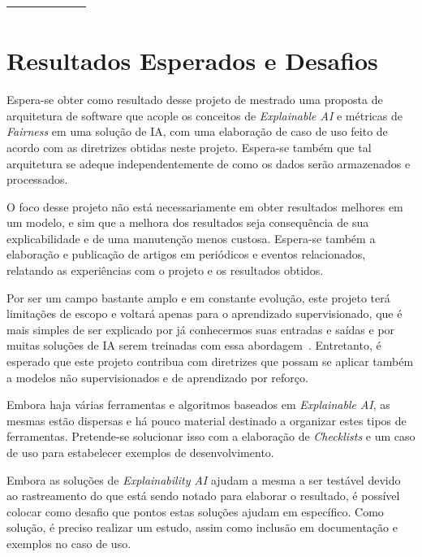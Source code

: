 \documentclass[portugues, 12pt, a4paper]{article}
\newcommand{\cmark}{\ding{51}}
\begin{document}
\begin{table}[h]
\begin{center}
{\begin{tabular}{ccccccccc}
     &  &  & \cmark &  & \cmark & \\
    \bottomrule
  \end{tabular}}
\end{center}
\end{table}

\section{Resultados Esperados e Desafios}

Espera-se obter como resultado desse projeto de mestrado uma proposta de arquitetura de software que acople os conceitos de \textit{Explainable AI} e métricas de \textit{Fairness} em uma solução de IA, com uma elaboração de caso de uso feito de acordo com as diretrizes obtidas neste projeto. Espera-se também que tal arquitetura se adeque independentemente de como os dados serão armazenados e processados.

O foco desse projeto não está necessariamente em obter resultados melhores em um modelo, e sim que a melhora dos resultados seja consequência de sua explicabilidade e de uma manutenção menos custosa. Espera-se também a elaboração e publicação de artigos em periódicos e eventos relacionados, relatando as experiências com o projeto e os resultados obtidos.

Por ser um campo bastante amplo e em constante evolução, este projeto terá limitações de escopo e voltará apenas para o aprendizado supervisionado, que é mais simples de ser explicado por já conhecermos suas entradas e saídas e por muitas soluções de IA serem treinadas com essa abordagem~\citep{Buolamwini_2018}. Entretanto, é esperado que este projeto contribua com diretrizes que possam se aplicar também a modelos não supervisionados e de aprendizado por reforço. 

Embora haja várias ferramentas e algoritmos baseados em \textit{Explainable AI}, as mesmas estão dispersas e há pouco material destinado a organizar estes tipos de ferramentas. Pretende-se solucionar isso com a elaboração de \textit{Checklists} e um caso de uso para estabelecer exemplos de desenvolvimento.

Embora as soluções de \textit{Explainability AI} ajudam a mesma a ser testável devido ao rastreamento do que está sendo notado para elaborar o resultado, é possível colocar como desafio que pontos estas soluções ajudam em específico. Como solução, é preciso realizar um estudo, assim como inclusão em documentação e exemplos no caso de uso.
\end{document}
